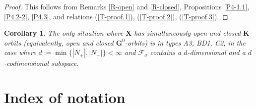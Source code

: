 \documentclass{amsart}
\newtheorem{corollary}{Corollary}
\theoremstyle{definition}
\begin{document}
\begin{proof}
This follows from Remarks \ref{R-open} and \ref{R-closed}, Propositions \ref{P4-1.1}, \ref{P4.2-2}, \ref{P4.3}, and relations (\ref{T-proof.1}), (\ref{T-proof.2}), (\ref{T-proof.3}).
\end{proof}


\begin{corollary}
The only situation where $\mathbf{X}$ has simultaneously open and closed $\mathbf{K}$-orbits (equivalently, open and closed $\mathbf{G}^0$-orbits) is in types
A3, BD1, C2, in the case where $d:=\min\{|N_+|,|N_-|\}<\infty$ and $\mathcal{F}_\sigma$
contains a $d$-dimensional and a $d$-codimensional subspace.
\end{corollary}

\section*{Index of notation}
\end{document}
